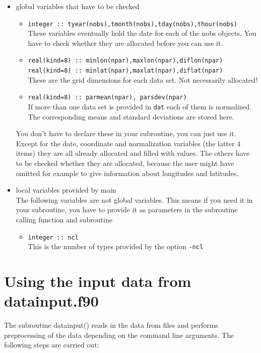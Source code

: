 \documentclass[12pt, oneside, a4paper, headsepline, plainheadsepline]{scrbook}
\begin{document}
\begin{itemize}
\item global variables that have to be checked
    \begin{itemize}
	\item \verb+integer :: tyear(nobs),tmonth(nobs),tday(nobs),thour(nobs)+ \\
		These variables eventually hold the date for each of the nobs objects. You have to check whether they are allocated before you
		can use it.
	\item \verb+real(kind=8) :: minlon(npar),maxlon(npar),diflon(npar)+ \\
              \verb+real(kind=8) :: minlat(npar),maxlat(npar),diflat(npar)+ \\
		These are the grid dimensions for each data set. Not necessarily allocated!
	\item \verb+real(kind=8) :: parmean(npar), parsdev(npar)+ \\
		If more than one data set is provided in \verb+dat+ each of them is normalized. 
		The corresponding means and standard deviations are stored here. 
	\end{itemize}
	You don't have to declare these in your subroutine, you can just use it. 
	Except for the date, coordinate and normalization variables (the latter 4 items) they are all already 
	allocated and filled with values. The others have to be checked whether they are allocated, because
	the user might have omitted for example to give information about longitudes and latitudes. 

\item local variables provided by main \\
	The following variables are not global variables. This means if you need it in your subroutine,
	you have to provide it as parameters in the subroutine calling function and subroutine 
	\begin{itemize}
	\item \verb+integer :: ncl+ \\
		This is the number of types provided by the option \verb+-ncl+
	\end{itemize}

\end{itemize}

\section{Using the input data from datainput.f90}

The subroutine datainput() reads in the data from files and performs preprocessing of the data 
depending on the command line arguments. The following steps are carried out:
\end{document}
